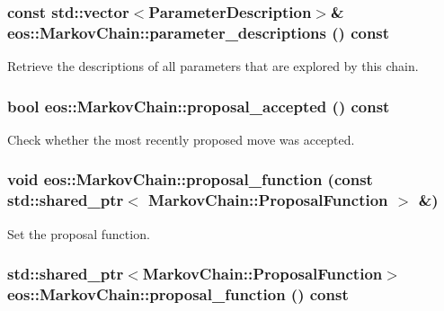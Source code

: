 \hypertarget{classeos_1_1MarkovChain_affcf4c3c4284fd0fae634c5cf1a97fa2}{
\subsubsection[{parameter\_\-descriptions}]{\setlength{\rightskip}{0pt plus 5cm}const std::vector$<${\bf ParameterDescription}$>$\& eos::MarkovChain::parameter\_\-descriptions () const}}
\label{classeos_1_1MarkovChain_affcf4c3c4284fd0fae634c5cf1a97fa2}


Retrieve the descriptions of all parameters that are explored by this chain. \hypertarget{classeos_1_1MarkovChain_a42c06afd1034be43e44bcbb24a15c808}{
\subsubsection[{proposal\_\-accepted}]{\setlength{\rightskip}{0pt plus 5cm}bool eos::MarkovChain::proposal\_\-accepted () const}}
\label{classeos_1_1MarkovChain_a42c06afd1034be43e44bcbb24a15c808}


Check whether the most recently proposed move was accepted. \hypertarget{classeos_1_1MarkovChain_a7fcacec6a56edd50b12efb67dcea432f}{
\subsubsection[{proposal\_\-function}]{\setlength{\rightskip}{0pt plus 5cm}void eos::MarkovChain::proposal\_\-function (const std::shared\_\-ptr$<$ {\bf MarkovChain::ProposalFunction} $>$ \&)}}
\label{classeos_1_1MarkovChain_a7fcacec6a56edd50b12efb67dcea432f}


Set the proposal function. \hypertarget{classeos_1_1MarkovChain_acfde2f6063a9ad8f6a4dabb548997b4d}{
\subsubsection[{proposal\_\-function}]{\setlength{\rightskip}{0pt plus 5cm}std::shared\_\-ptr$<${\bf MarkovChain::ProposalFunction}$>$ eos::MarkovChain::proposal\_\-function () const}}
\label{classeos_1_1MarkovChain_acfde2f6063a9ad8f6a4dabb548997b4d}


